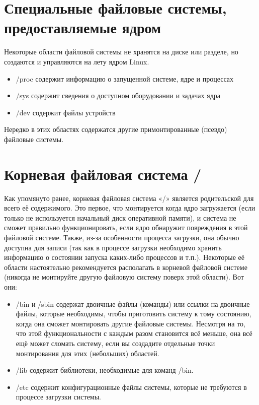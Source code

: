\documentclass[10pt]{book}
\begin{document}
\section{Специальные файловые системы, предоставляемые ядром}

Некоторые области файловой системы не хранятся на диске или разделе, но создаются и управляются на лету ядром Linux.

\begin{itemize}
 \item /proc содержит информацию о запущенной системе, ядре и процессах
 \item /sys содержит сведения о доступном оборудовании и задачах ядра
 \item /dev содержит файлы устройств 
\end{itemize}

Нередко в этих областях содержатся другие примонтированные (псевдо) файловые системы.

\section {Корневая файловая система /}

Как упомянуто ранее, корневая файловая система «/» является родительской для всего её содержимого. Это первое, что монтируется когда ядро загружается (если только не используется начальный диск оперативной памяти), и система не сможет правильно функционировать, если ядро обнаружит повреждения в этой файловой системе. Также, из-за особенности процесса загрузки, она обычно доступна для записи (так как в процессе загрузки необходимо хранить информацию о состоянии запуска каких-либо процессов и т.п.).
Некоторые её области настоятельно рекомендуется располагать в корневой файловой системе (никогда не монтируйте другую файловую систему поверх этой области). Вот они:

\begin{itemize}
\item /bin и /sbin содержат двоичные файлы (команды) или ссылки на двоичные файлы, которые необходимы, чтобы приготовить систему к тому состоянию, когда она сможет монтировать другие файловые системы. Несмотря на то, что этой функциональности с каждым разом становится всё меньше, она всё ещё может сломать систему, если вы создадите отдельные точки монтирования для этих (небольших) областей.
\item /lib содержит библиотеки, необходимые для команд  /bin.
\item /etc содержит конфигурационные файлы системы, которые не требуются в процессе загрузки системы.
\end{itemize}
\end{document}
